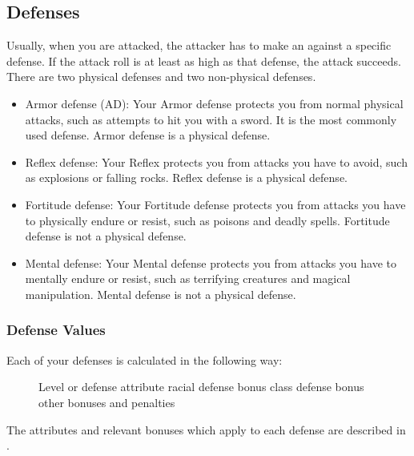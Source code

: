     \subsection{Defenses}\label{Defenses}
        Usually, when you are attacked, the attacker has to make an  against a specific defense.
        If the attack roll is at least as high as that defense, the attack succeeds.
        There are two physical defenses and two non-physical defenses.
        \begin{itemize}
            \item Armor defense (AD): Your Armor defense protects you from normal physical attacks, such as attempts to hit you with a sword.
                It is the most commonly used defense.
                Armor defense is a physical defense.
            \item Reflex defense: Your Reflex protects you from attacks you have to avoid, such as explosions or falling rocks.
                Reflex defense is a physical defense.
            \item Fortitude defense: Your Fortitude defense protects you from attacks you have to physically endure or resist, such as poisons and deadly spells.
                Fortitude defense is not a physical defense.
            \item Mental defense: Your Mental defense protects you from attacks you have to mentally endure or resist, such as terrifying creatures and magical manipulation.
                Mental defense is not a physical defense.
        \end{itemize}

        \subsubsection{Defense Values}\label{Defense Values}

            Each of your defenses is calculated in the following way:

            \begin{figure}[h]
                \centering Level or defense attribute \add racial defense bonus \add class defense bonus \add other bonuses and penalties
            \end{figure}

            The attributes and relevant bonuses which apply to each defense are described in .

